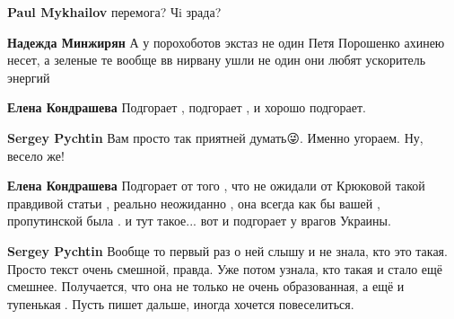 \begin{itemize}
\begin{itemize}
\textbf{Paul Mykhailov} перемога? Чi зрада?

 
\textbf{Надежда Минжирян} А у порохоботов экстаз не один Петя Порошенко ахинею несет, а зеленые те вообще вв нирвану ушли не один они любят ускоритель энергий

 
\textbf{Елена Кондрашева} Подгорает , подгорает , и хорошо подгорает.

 
\textbf{Sergey Pychtin} Вам просто так приятней думать😜. Именно угораем. Ну, весело же!

 
\textbf{Елена Кондрашева} Подгорает от того , что не ожидали от Крюковой такой правдивой статьи , реально неожиданно , она всегда как бы вашей , пропутинской была . и тут такое... вот и подгорает у врагов Украины.

 
\textbf{Sergey Pychtin} Вообще то первый раз о ней слышу и не знала, кто это такая. Просто текст очень смешной, правда. Уже потом узнала, кто такая и стало ещё смешнее. Получается, что она не только не очень образованная, а ещё и тупенькая🤣. Пусть пишет дальше, иногда хочется повеселиться.

 

\end{itemize}
\end{itemize}

